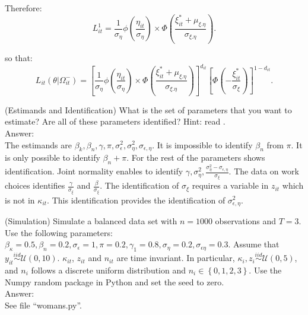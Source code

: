 \begin{exercise}
\noindent Therefore:
\begin{equation}
L_{it}^1 = \frac{1}{\sigma_{\eta}} \phi \left( \frac{\eta_{it}}{\sigma_{\eta}} \right) \times \Phi \left( \frac{\xi_{it}^{*} + \mu_{\xi.\eta}}{\sigma_{\xi.\eta}} \right).
\end{equation}

\noindent so that:
\begin{equation}
L_{it} \left( \theta | \Omega_{it}^{-} \right) = \left[\frac{1}{\sigma_{\eta}} \phi \left( \frac{\eta_{it}}{\sigma_{\eta}} \right) \times \Phi \left( \frac{\xi_{it}^{*} + \mu_{\xi.\eta}}{\sigma_{\xi.\eta}} \right) \right]^{d_{it}} \left[ \Phi \left( - \frac{\xi_{it}^{*}}{\sigma_{\xi}}  \right) \right]^{1-d_{it}}.
\end{equation}











 




\end{exercise}

\begin{exercise} (Estimands and Identification) \label{exercise:estimands}
What is the set of parameters that you want to estimate? Are all of these parameters identified? Hint: read \citet{heckman1979sample}.\\ 
\noindent Answer:\\
\noindent The estimands are $\beta_{k}, \beta_{n}, \gamma, \pi, \sigma_{\epsilon}^2, \sigma_{\eta}^2, \sigma_{\epsilon, \eta} $. It is impossible to identify $\beta_{n}$ from $\pi$. It is only possible to identify $\beta_{n} + \pi$. For the rest of the parameters \citet{heckman1979sample} shows identification. Joint normality enables to identify $\gamma, \sigma_{\eta}^2, \frac{\sigma_{\eta}^2 - \sigma_{\epsilon, \eta}}{\sigma_{\xi}}$. The data on work choices identifies $\frac{\gamma}{\sigma_{\xi}}$ and $\frac{\beta}{\sigma_{\xi}}$. The identification of $\sigma_{\xi}$ requires a variable in $z_{it}$ which is not in $\kappa_{it}$. This identification provides the identification of $\sigma_{\epsilon, \eta}^2$. 
\end{exercise}

\begin{exercise} (Simulation) \label{exercise:simulations}
Simulate a balanced data set with $n = 1000$ observations and $T=3$. Use the following parameters: $\beta_\kappa = 0.5, \beta_n = 0.2, \sigma_\epsilon = 1, \pi = 0.2, \gamma_1 = 0.8, \sigma_\eta = 0.2, \sigma_{\epsilon \eta} = 0.3$. Assume that $y_{it} \overset{iid}{\sim} \mathcal{U} (0,10)$. $\kappa_{it}$, $z_{it}$ and $n_{it}$ are time invariant. In particular, $\kappa_{i}, z_{i} \overset{iid}{\sim} \mathcal{U} (0,5)$, and $n_{i}$ follows a discrete uniform distribution and $n_{i} \in \left\{0,1,2,3\right\}$. Use the Numpy random package in Python and set the seed to zero.\\
\noindent Answer:\\
\noindent See file ``womans.py''.
\end{exercise}

